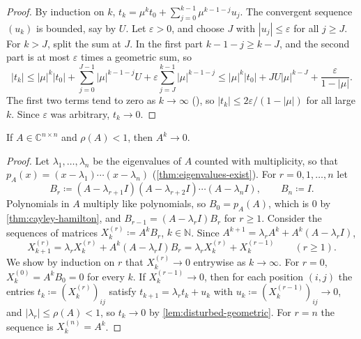 \begin{proof}
By induction on $k$, $t_k=\mu^kt_0+\sum_{j=0}^{k-1}\mu^{k-1-j}u_j$. The convergent sequence $(u_k)$ is bounded, say by $U$. Let $\varepsilon>0$, and choose $J$ with $|u_j|\le\varepsilon$ for all $j\ge J$. For $k>J$, split the sum at $J$. In the first part $k-1-j\ge k-J$, and the second part is at most $\varepsilon$ times a geometric sum, so
\[
|t_k|\le|\mu|^k|t_0|+\sum_{j=0}^{J-1}|\mu|^{k-1-j}U+\varepsilon\sum_{j=J}^{k-1}|\mu|^{k-1-j}\le|\mu|^k|t_0|+JU|\mu|^{k-J}+\frac{\varepsilon}{1-|\mu|}.
\]
The first two terms tend to zero as $k\to\infty$ (), so $|t_k|\le2\varepsilon/(1-|\mu|)$ for all large $k$. Since $\varepsilon$ was arbitrary, $t_k\to0$.
\end{proof}

\begin{corollary}
\label{cor:powers-general}
If $A\in\mathbb C^{n\times n}$ and $\rho(A)<1$, then $A^k\to0$.
\end{corollary}

\begin{proof}
Let $\lambda_1,\ldots,\lambda_n$ be the eigenvalues of $A$ counted with multiplicity, so that $p_A(x)=(x-\lambda_1)\cdots(x-\lambda_n)$ (\cref{thm:eigenvalues-exist}). For $r=0,1,\ldots,n$ let
\[
B_r\coloneqq(A-\lambda_{r+1}I)(A-\lambda_{r+2}I)\cdots(A-\lambda_nI),\qquad B_n\coloneqq I .
\]
Polynomials in $A$ multiply like polynomials, so $B_0=p_A(A)$, which is $0$ by \cref{thm:cayley-hamilton}, and $B_{r-1}=(A-\lambda_rI)B_r$ for $r\ge1$. Consider the sequences of matrices $X^{(r)}_k\coloneqq A^kB_r$, $k\in\mathbb N$. Since $A^{k+1}=\lambda_rA^k+A^k(A-\lambda_rI)$,
\[
X^{(r)}_{k+1}=\lambda_rX^{(r)}_k+A^k(A-\lambda_rI)B_r=\lambda_rX^{(r)}_k+X^{(r-1)}_k\qquad(r\ge1).
\]
We show by induction on $r$ that $X^{(r)}_k\to0$ entrywise as $k\to\infty$. For $r=0$, $X^{(0)}_k=A^kB_0=0$ for every $k$. If $X^{(r-1)}_k\to0$, then for each position $(i,j)$ the entries $t_k\coloneqq(X^{(r)}_k)_{ij}$ satisfy $t_{k+1}=\lambda_rt_k+u_k$ with $u_k\coloneqq(X^{(r-1)}_k)_{ij}\to0$, and $|\lambda_r|\le\rho(A)<1$, so $t_k\to0$ by \cref{lem:disturbed-geometric}. For $r=n$ the sequence is $X^{(n)}_k=A^k$.
\end{proof}

